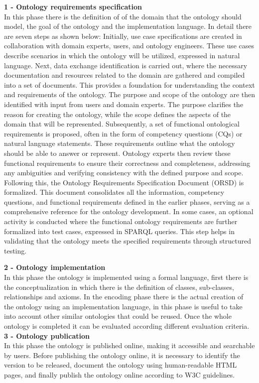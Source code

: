 \textbf{1 - Ontology requirements specification}\\
In this phase there is the definition of of the domain that the ontology should model, the goal of the ontology and the implementation language. In detail there are seven steps as shown below:
Initially, use case specifications are created in collaboration with domain experts, users, and ontology engineers. These use cases describe scenarios in which the ontology will be utilized, expressed in natural language. Next, data exchange identification is carried out, where the necessary documentation and resources related to the domain are gathered and compiled into a set of documents. This provides a foundation for understanding the context and requirements of the ontology. The purpose and scope of the ontology are then identified with input from users and domain experts. The purpose clarifies the reason for creating the ontology, while the scope defines the aspects of the domain that will be represented. Subsequently, a set of functional ontological requirements is proposed, often in the form of competency questions (CQs) or natural language statements. These requirements outline what the ontology should be able to answer or represent. Ontology experts then review these functional requirements to ensure their correctness and completeness, addressing any ambiguities and verifying consistency with the defined purpose and scope. Following this, the Ontology Requirements Specification Document (ORSD) is formalized. This document consolidates all the information, competency questions, and functional requirements defined in the earlier phases, serving as a comprehensive reference for the ontology development. In some cases, an optional activity is conducted where the functional ontology requirements are further formalized into test cases, expressed in SPARQL queries. This step helps in validating that the ontology meets the specified requirements through structured testing.

\textbf{2 - Ontology implementation}\\
In this phase the ontology is implemented using a formal language, first there is the conceptualization in which there is the definition of classes, sub-classes, relationships and axioms. In the encoding phase there is the actual creation of the ontology using an implementation language, in this phase is useful to take into account other similar ontologies that could be reused. Once the whole ontology is completed it can be evaluated according different evaluation criteria. \\
\textbf{3 - Ontology publication}\\
In this phase the ontology is published online, making it accessible and searchable by users. Before publishing the ontology online, it is necessary to identify the version to be released, document the ontology using human-readable HTML pages, and finally publish the ontology online according to W3C guidelines.\cite{ontology_online}\\


